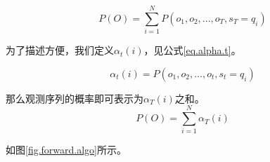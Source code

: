 \documentclass[]{article}
\begin{document}
    \begin{equation}
    	P(O)=\sum_{i=1}^{N}P(o_{1},o_{2},...,o_{T},s_{T}=q_{i}) \label{eq.PO.forward}
    \end{equation} 
    
    为了描述方便，我们定义$\alpha_{t}(i)$，见公式\ref{eq.alpha.t}。
    
    \begin{equation}
  		\alpha_{t}(i)=P(o_{1}, o_{2}, ..., o_{t}, s_{t}=q_{i}) \label{eq.alpha.t}
    \end{equation}
    
    那么观测序列的概率即可表示为$\alpha_{T}(i)$之和。
    \begin{equation}
    	P(O)=\sum_{i=1}^{N}\alpha_{T}(i) \label{eq.PO.alphaT}
    \end{equation}
    
    如图\ref{fig.forward.algo}所示。
\end{document}
